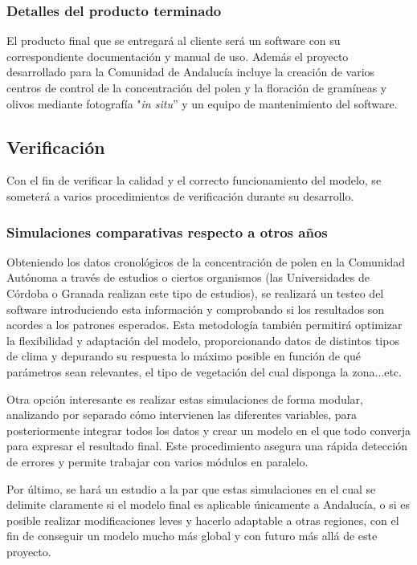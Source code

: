 \documentclass[12pt,oneside,a4paper]{article}
\numberwithin{figure}{section}
\begin{document}
\subsubsection{Detalles del producto terminado}

El producto final que se entregará al cliente será un software con su correspondiente documentación y manual de uso. Además el proyecto desarrollado para la Comunidad de Andalucía incluye la creación de varios centros de control de la concentración del polen y la floración de gramíneas y olivos mediante fotografía "\textit{in situ}” y un equipo de mantenimiento del software.


\subsection{Verificación}

Con el fin de verificar la calidad y el correcto funcionamiento del modelo, se someterá a varios procedimientos de verificación durante su desarrollo.

\subsubsection{Simulaciones comparativas respecto a otros años}

Obteniendo los datos cronológicos de la concentración de polen en la Comunidad Autónoma a través de estudios o ciertos organismos (las Universidades de Córdoba o Granada realizan este tipo de estudios), se realizará un testeo del software introduciendo esta información y comprobando si los resultados son acordes a los patrones esperados. Esta metodología también permitirá optimizar la flexibilidad y adaptación del modelo, proporcionando datos de distintos tipos de clima y depurando su respuesta lo máximo posible en función de qué parámetros sean relevantes, el tipo de vegetación del cual disponga la zona...etc.

Otra opción interesante es realizar estas simulaciones de forma modular, analizando por separado cómo intervienen las diferentes variables, para posteriormente integrar todos los datos y crear un modelo en el que todo converja para expresar el resultado final. Este procedimiento asegura una rápida detección de errores y permite trabajar con varios módulos en paralelo.

Por último, se hará un estudio a la par que estas simulaciones en el cual se delimite claramente si el modelo final es aplicable únicamente a Andalucía, o si es posible realizar modificaciones leves y hacerlo adaptable a otras regiones, con el fin de conseguir un modelo mucho más global y con futuro más allá de este proyecto.
\end{document}
